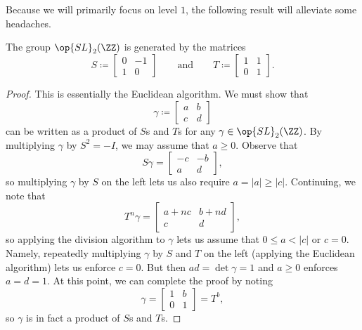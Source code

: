 \documentclass{amsart}
\begin{document}
Because we will primarily focus on level $1$, the following result will alleviate some headaches.
\begin{proposition} \label{prop:gens-for-sl2z}
	The group $\op{SL}_2(\ZZ)$ is generated by the matrices
	\[S\coloneqq\begin{bmatrix}
		0 & -1 \\
		1 & 0
	\end{bmatrix}\qquad\text{and}\qquad T\coloneqq\begin{bmatrix}
		1 & 1 \\
		0 & 1
	\end{bmatrix}.\]
\end{proposition}
\begin{proof}
	This is essentially the Euclidean algorithm. We must show that
	\[\gamma\coloneqq\begin{bmatrix}
		a & b \\
		c & d
	\end{bmatrix}\]
	can be written as a product of $S$s and $T$s for any $\gamma\in\op{SL}_2(\ZZ)$. By multiplying $\gamma$ by $S^2=-I$, we may assume that $a\ge0$. Observe that
	\[S\gamma=\begin{bmatrix}
		-c & -b \\
		a & d
	\end{bmatrix},\]
	so multiplying $\gamma$ by $S$ on the left lets us also require $a=|a|\ge|c|$. Continuing, we note that
	\[T^n\gamma=\begin{bmatrix}
		a+nc & b+nd \\
		c & d
	\end{bmatrix},\]
	so applying the division algorithm to $\gamma$ lets us assume that $0\le a<|c|$ or $c=0$. Namely, repeatedly multiplying $\gamma$ by $S$ and $T$ on the left (applying the Euclidean algorithm) lets us enforce $c=0$. But then $ad=\det\gamma=1$ and $a\ge0$ enforces $a=d=1$. At this point, we can complete the proof by noting
	\[\gamma=\begin{bmatrix}
		1 & b \\
		0 & 1
	\end{bmatrix}=T^b,\]
	so $\gamma$ is in fact a product of $S$s and $T$s.
\end{proof}
\end{document}
